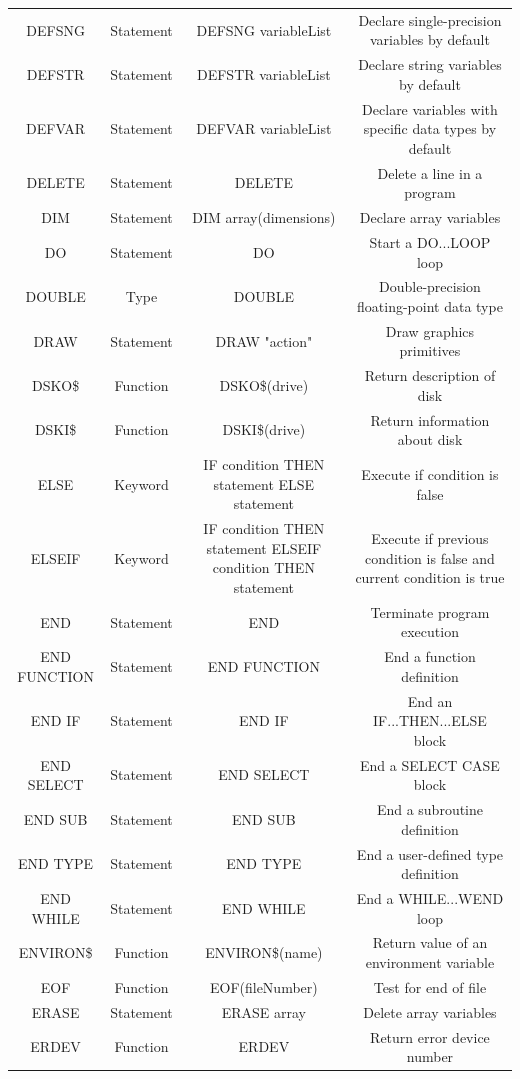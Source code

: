\documentclass[10pt, reqno]{exam}
\begin{document}
{\begin{longtable}{|c|c|c|c|}
    DEFSNG & Statement & DEFSNG variableList & Declare single-precision variables by default \\
    DEFSTR & Statement & DEFSTR variableList & Declare string variables by default \\
    DEFVAR & Statement & DEFVAR variableList & Declare variables with specific data types by default \\
    DELETE & Statement & DELETE & Delete a line in a program \\
    DIM & Statement & DIM array(dimensions) & Declare array variables \\
    DO & Statement & DO & Start a DO...LOOP loop \\
    DOUBLE & Type & DOUBLE & Double-precision floating-point data type \\
    DRAW & Statement & DRAW "action" & Draw graphics primitives \\
    DSKO\$ & Function & DSKO\$(drive) & Return description of disk \\
    DSKI\$ & Function & DSKI\$(drive) & Return information about disk \\
    ELSE & Keyword & IF condition THEN statement ELSE statement & Execute if condition is false \\
    ELSEIF & Keyword & IF condition THEN statement ELSEIF condition THEN statement & Execute if previous condition is false and current condition is true \\
    END & Statement & END & Terminate program execution \\
    END FUNCTION & Statement & END FUNCTION & End a function definition \\
    END IF & Statement & END IF & End an IF...THEN...ELSE block \\
    END SELECT & Statement & END SELECT & End a SELECT CASE block \\
    END SUB & Statement & END SUB & End a subroutine definition \\
    END TYPE & Statement & END TYPE & End a user-defined type definition \\
    END WHILE & Statement & END WHILE & End a WHILE...WEND loop \\
    ENVIRON\$ & Function & ENVIRON\$(name) & Return value of an environment variable \\
    EOF & Function & EOF(fileNumber) & Test for end of file \\
    ERASE & Statement & ERASE array & Delete array variables \\
    ERDEV & Function & ERDEV & Return error device number \\

\end{longtable}}
\end{document}
